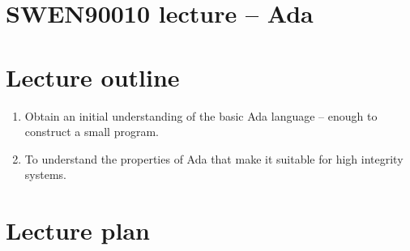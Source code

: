\documentclass[11pt]{article}
\begin{document}
\section*{SWEN90010 lecture -- Ada}

\section*{Lecture outline}

 \begin{enumerate}
  
  \item Obtain an initial understanding of the basic Ada language -- enough to construct a small program.

  \item To understand the properties of Ada that make it suitable for high integrity systems.


 \end{enumerate}

\section*{Lecture plan}
\end{document}
